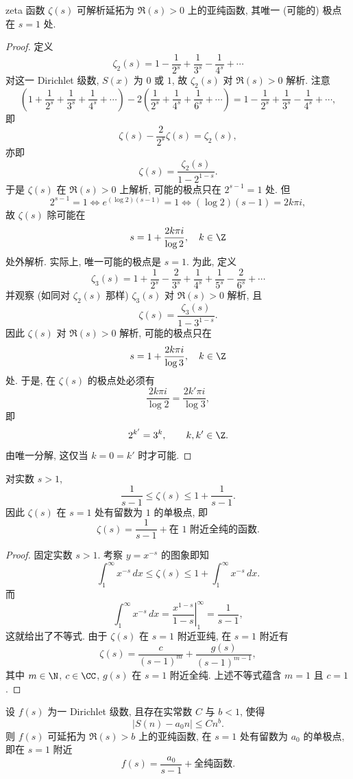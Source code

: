 \begin{lemma}\label{lem:vi.2.3}
zeta 函数 $\zeta(s)$ 可解析延拓为 $\Re(s)>0$ 上的亚纯函数, 其唯一 (可能的) 极点在 $s=1$ 处.
\end{lemma}

\begin{proof}
定义
\[
\zeta_{2}(s)=1-\frac{1}{2^{s}}+\frac{1}{3^{s}}-\frac{1}{4^{s}}+\cdots
\]
对这一 Dirichlet 级数, $S(x)$ 为 $0$ 或 $1$, 故 $\zeta_2(s)$ 对 $\Re(s)>0$ 解析. 注意
\[
\left(1+\frac{1}{2^{s}}+\frac{1}{3^{s}}+\frac{1}{4^{s}}+\cdots\right)-2\left(\frac{1}{2^{s}}+\frac{1}{4^{s}}+\frac{1}{6^{s}}+\cdots\right)=1-\frac{1}{2^{s}}+\frac{1}{3^{s}}-\frac{1}{4^{s}}+\cdots,
\]
即
\[
\zeta(s)-\frac{2}{2^{s}}\zeta(s)=\zeta_{2}(s),
\]
亦即
\[
\zeta(s)=\frac{\zeta_{2}(s)}{1-2^{1-s}}.
\]
于是 $\zeta(s)$ 在 $\Re(s)>0$ 上解析, 可能的极点只在 $2^{s-1}=1$ 处. 但
\[
2^{s-1}=1\iff e^{(\log 2)(s-1)}=1\iff(\log 2)(s-1)=2k\pi i,
\]
故 $\zeta(s)$ 除可能在
\[
s=1+\frac{2k\pi i}{\log 2},\quad k\in\Z
\]
处外解析. 实际上, 唯一可能的极点是 $s=1$. 为此, 定义
\[
\zeta_{3}(s)=1+\frac{1}{2^{s}}-\frac{2}{3^{s}}+\frac{1}{4^{s}}+\frac{1}{5^{s}}-\frac{2}{6^{s}}+\cdots
\]
并观察 (如同对 $\zeta_2(s)$ 那样) $\zeta_3(s)$ 对 $\Re(s)>0$ 解析, 且
\[
\zeta(s)=\frac{\zeta_{3}(s)}{1-3^{1-s}}.
\]
因此 $\zeta(s)$ 对 $\Re(s)>0$ 解析, 可能的极点只在
\[
s=1+\frac{2k\pi i}{\log 3},\quad k\in\Z
\]
处. 于是, 在 $\zeta(s)$ 的极点处必须有
\[
\frac{2k\pi i}{\log 2}=\frac{2k'\pi i}{\log 3},
\]
即
\[
2^{k'}=3^{k},\qquad k,k'\in\Z.
\]
由唯一分解, 这仅当 $k=0=k'$ 时才可能.
\end{proof}

\begin{lemma}\label{lem:vi.2.4}
对实数 $s>1$,
\[
\frac{1}{s-1}\le\zeta(s)\le 1+\frac{1}{s-1}.
\]
因此 $\zeta(s)$ 在 $s=1$ 处有留数为 $1$ 的单极点, 即
\[
\zeta(s)=\frac{1}{s-1}+\text{在 $1$ 附近全纯的函数}.
\]
\end{lemma}

\begin{proof}
固定实数 $s>1$. 考察 $y=x^{-s}$ 的图象即知
\[
\int_{1}^{\infty}x^{-s}\,dx\le\zeta(s)\le 1+\int_{1}^{\infty}x^{-s}\,dx.
\]
而
\[
\int_{1}^{\infty}x^{-s}\,dx=\left.\frac{x^{1-s}}{1-s}\right|_{1}^{\infty}=\frac{1}{s-1},
\]
这就给出了不等式. 由于 $\zeta(s)$ 在 $s=1$ 附近亚纯, 在 $s=1$ 附近有
\[
\zeta(s)=\frac{c}{(s-1)^{m}}+\frac{g(s)}{(s-1)^{m-1}},
\]
其中 $m\in\N$, $c\in\CC$, $g(s)$ 在 $s=1$ 附近全纯. 上述不等式蕴含 $m=1$ 且 $c=1$.
\end{proof}

\begin{proposition}\label{prop:vi.2.5}
设 $f(s)$ 为一 Dirichlet 级数, 且存在实常数 $C$ 与 $b<1$, 使得
\[
|S(n)-a_{0}n|\le Cn^{b}.
\]
则 $f(s)$ 可延拓为 $\Re(s)>b$ 上的亚纯函数, 在 $s=1$ 处有留数为 $a_0$ 的单极点, 即在 $s=1$ 附近
\[
f(s)=\frac{a_{0}}{s-1}+\text{全纯函数}.
\]
\end{proposition}

